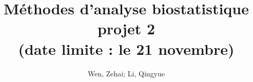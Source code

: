 \documentclass[12pt]{report}
\title{Méthodes d'analyse biostatistique projet 2 \\ (date limite : le 21 novembre)}
\author{Wen, Zehai; Li, Qingyue }
\date{\DTMnow}
\theoremstyle{plain}
\theoremstyle{definition}
\begin{document}
\begin{CJK*}{UTF8}{gbsn}
\maketitle

\setcounter{tocdepth}{0}













\end{CJK*}
\end{document}
